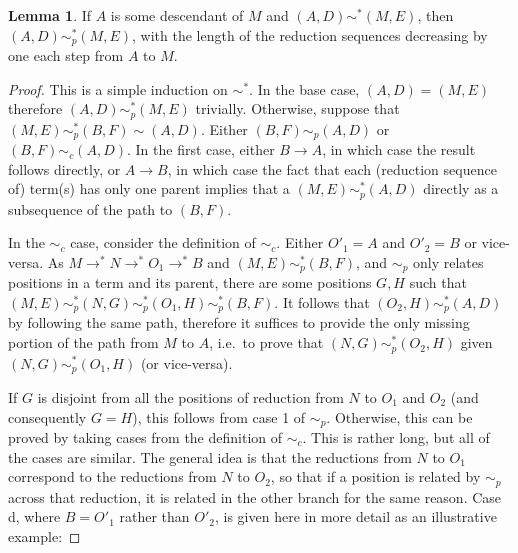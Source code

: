 \documentclass{article}
\theoremstyle{definition}
\theoremstyle{lemma}
\newtheorem{lemma}{Lemma}
\theoremstyle{remark}
\begin{document}
\begin{lemma} \label{simpDoesn'tMix}
If $A$ is some descendant of $M$ and $(A,D) \sim^* (M,E)$, then $(A,D) \sim_p^* (M,E)$, with the length of the reduction sequences decreasing by one each step from $A$ to $M$.
\end{lemma}
\begin{proof}
This is a simple induction on $\sim^*$. In the base case, $(A,D) = (M,E)$ therefore $(A,D) \sim_p^* (M,E)$ trivially. Otherwise, suppose that $(M,E) \sim_p^* (B,F) \sim (A,D)$. Either $(B,F) \sim_p (A,D)$ or $(B,F) \sim_c (A,D)$. In the first case, either $B \to A$, in which case the result follows directly, or $A \to B$, in which case the fact that each (reduction sequence of) term(s) has only one parent implies that a $(M,E) \sim_p^* (A,D)$ directly as a subsequence of the path to $(B,F)$.

In the $\sim_c$ case, consider the definition of $\sim_c$. Either $O'_1 = A$ and $O'_2 = B$ or vice-versa. As $M \to^* N \to^* O_1 \to^* B$ and $(M,E) \sim_p^* (B,F)$, and $\sim_p$ only relates positions in a term and its parent, there are some positions $G, H$ such that $(M,E) \sim_p^* (N,G) \sim_p^* (O_1, H) \sim_p^* (B,F)$. It follows that $(O_2, H) \sim_p^* (A,D)$ by following the same path, therefore it suffices to provide the only missing portion of the path from $M$ to $A$, i.e.~to prove that $(N,G) \sim_p^* (O_2,H)$ given $(N,G) \sim_p^* (O_1,H)$ (or vice-versa).

If $G$ is disjoint from all the positions of reduction from $N$ to $O_1$ and $O_2$ (and consequently $G = H$), this follows from case 1 of $\sim_p$. Otherwise, this can be proved by taking cases from the definition of $\sim_c$. This is rather long, but all of the cases are similar. The general idea is that the reductions from $N$ to $O_1$ correspond to the reductions from $N$ to $O_2$, so that if a position is related by $\sim_p$ across that reduction, it is related in the other branch for the same reason. Case d, where $B = O'_1$ rather than $O'_2$, is given here in more detail as an illustrative example:


\end{proof}
\end{document}
